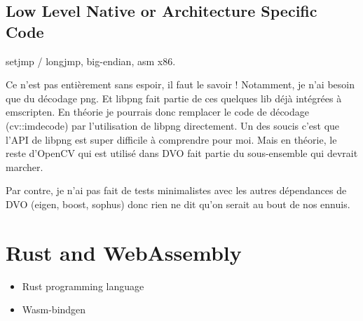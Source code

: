 \subsection{Low Level Native or Architecture Specific Code}%
\label{sub:low_level_code}

setjmp / longjmp, big-endian, asm x86.

Ce n’est pas entièrement sans espoir, il faut le savoir ! Notamment, je n’ai besoin que du décodage png. Et libpng fait partie de ces quelques lib déjà intégrées à emscripten. En théorie je pourrais donc remplacer le code de décodage (cv::imdecode) par l’utilisation de libpng directement. Un des soucis c’est que l’API de libpng est super difficile à comprendre pour moi. Mais en théorie, le reste d’OpenCV qui est utilisé dans DVO fait partie du sous-ensemble qui devrait marcher.

Par contre, je n’ai pas fait de tests minimalistes avec les autres dépendances de DVO (eigen, boost, sophus) donc rien ne dit qu’on serait au bout de nos ennuis.

\section{Rust and WebAssembly}%
\label{sec:rust_wasm}

\begin{itemize}
	\item Rust programming language
	\item Wasm-bindgen
\end{itemize}
